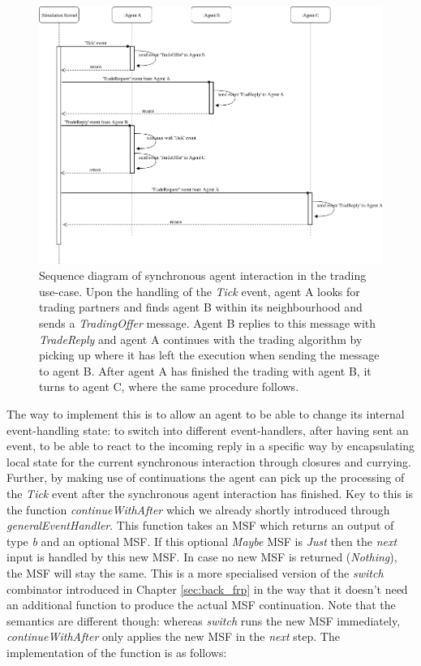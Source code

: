 \begin{figure}
	\centering
	\includegraphics[width=1.0\textwidth, angle=0]{./fig/eventdriven/syncagentinteractions.png}
	\caption{Sequence diagram of synchronous agent interaction in the trading use-case. Upon the handling of the \textit{Tick} event, agent A looks for trading partners and finds agent B within its neighbourhood and sends a \textit{TradingOffer} message. Agent B replies to this message with \textit{TradeReply} and agent A continues with the trading algorithm by picking up where it has left the execution when sending the message to agent B. After agent A has finished the trading with agent B, it turns to agent C, where the same procedure follows.}
	\label{fig:syncagentinteractions}
\end{figure}

The way to implement this is to allow an agent to be able to change its internal event-handling state: to switch into different event-handlers, after having sent an event, to be able to react to the incoming reply in a specific way by encapsulating local state for the current synchronous interaction through closures and currying. Further, by making use of continuations the agent can pick up the processing of the \textit{Tick} event after the synchronous agent interaction has finished. Key to this is the function \textit{continueWithAfter} which we already shortly introduced through \textit{generalEventHandler}. This function takes an MSF which returns an output of type \textit{b} and an optional MSF. If this optional \textit{Maybe} MSF is \textit{Just} then the \textit{next} input is handled by this new MSF. In case no new MSF is returned (\textit{Nothing}), the MSF will stay the same. This is a more specialised version of the \textit{switch} combinator introduced in Chapter \ref{sec:back_frp} in the way that it doesn't need an additional function to produce the actual MSF continuation. Note that the semantics are different though: whereas \textit{switch} runs the new MSF immediately, \textit{continueWithAfter} only applies the new MSF in the \textit{next} step. The implementation of the function is as follows:

